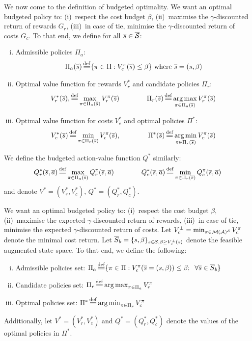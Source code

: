 \documentclass{article}
\begin{document}
\begin{definition}
We now come to the definition of budgeted optimality. We want an optimal budgeted policy to: (i)~respect the cost budget $\beta$, (ii)~maximise the $\gamma$-discounted return of rewards $G_r$, (iii)~in case of tie, minimise the $\gamma$-discounted return of costs $G_c$. To that end, we define for all $\overline{s}\in\overline{\mathcal{S}}$:
\begin{enumerate}[(i)]
    \item Admissible policies $\Pi_a$: 
    \begin{equation}
    \Pi_a(\os) \eqdef \{\pi\in\Pi: V_c^\pi(\os) \leq \beta\}\text{ where }\os = (s, \beta)
    \end{equation}
    \item Optimal value function for rewards $V_r^*$ and candidate policies $\Pi_r$: 
    \begin{equation}
        V_r^*(\os), \eqdef \max_{\pi\in\Pi_a(\os)}  V_r^\pi(\os) \qquad\qquad \Pi_r(\os) \eqdef \argmax_{\pi\in\Pi_a(\os)}  V_r^\pi(\os)
    \end{equation}
    \item Optimal value function for costs $V_c^*$ and optimal policies $\Pi^*$: 
    \begin{equation}
        V_c^*(\os) \eqdef \min_{\pi\in\Pi_r(\os)}  V_c^\pi(\os), \qquad\qquad \Pi^*(\os) \eqdef \argmin_{\pi\in\Pi_r(\os)}  V_c^\pi(\os)
    \end{equation}
\end{enumerate}
We define the budgeted action-value function $Q^*$ similarly:
\begin{equation}
    Q_r^*(\os, \oa) \eqdef \max_{\pi\in\Pi_a(\os)}  Q_r^\pi(\os, \oa) \qquad\qquad Q_c^*(\os, \oa) \eqdef \min_{\pi\in\Pi_r(\os)}  Q_c^\pi(\os, \oa) 
\end{equation}
and denote $V^* = (V_r^*, V_c^*)$, $Q^* = (Q_r^*, Q_c^*)$.
\end{definition}

\begin{definition}
We want an optimal budgeted policy to: (i)~respect the cost budget $\beta$, (ii)~maximise the expected $\gamma$-discounted return of rewards, (iii)~in case of tie, minimise the expected $\gamma$-discounted return of costs. Let $V_c^\bot = \min_{\pi\in\mathcal{M}(\mathcal{A})^{\mathcal{S}}} V_c^\pi$ denote the minimal cost return. Let $\overline{S}_b = \{s,\beta\}_{s\in\mathcal{S}, \beta\geq V_c^\bot(s)}$ denote the feasible augmented state space. To that end, we define the following:
\begin{enumerate}[(i)]
    \item Admissible policies set: $\Pi_a \eqdef \{\pi\in\Pi: V_c^\pi(\os=(s, \beta)) \leq \beta ;\;\; \forall \os\in\overline{S}_b\}$
    \item Candidate policies set: $\Pi_r \eqdef \argmax_{\pi\in\Pi_a}  V_r^\pi$
    \item Optimal policies set: $\Pi^* \eqdef \argmin_{\pi\in\Pi_r}  V_c^\pi$
\end{enumerate}
Additionally, let $V^* = (V_r^*, V_c^*)$ and $Q^* = (Q_r^*, Q_c^*)$ denote the values of the optimal policies in $\Pi^*$.
\end{definition}
\end{document}
